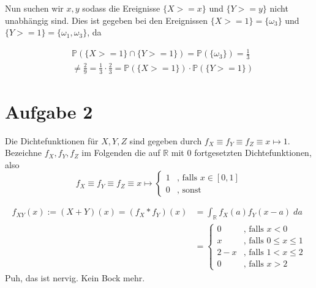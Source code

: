 \documentclass[11pt,a4paper,ngerman]{article}
\newcommand{\set}[1]{ \{ #1 \}}
\newcommand{\Prob}{\mathbb{P}}
\begin{document}
Nun suchen wir $x, y$ sodass die Ereignisse $\set{X >= x}$ und $\set{Y >= y}$ nicht unabhängig sind.
Dies ist gegeben bei den Ereignissen $\set{X >=1}  = \set{\omega_3}$ und $\set{Y >=1} = \set{\omega_1, \omega_3}$, da

\begin{equation}\begin{split}
 &\Prob(\set{X >=1} \cap \set{Y>=1})=  \Prob(\set{\omega_3}) =  \frac{1}{3} \\
&\neq \frac{2}{9}= \frac{1}{3} \cdot \frac{2}{3} = \Prob(\set{X>=1}) \cdot \Prob(\set{Y>=1})
\end{split}\end{equation}

\section*{Aufgabe 2}
Die Dichtefunktionen für $X, Y, Z$ sind gegeben durch $f_X \equiv f_Y \equiv f_Z \equiv x \mapsto 1$.
Bezeichne $f_X, f_Y, f_Z$ im Folgenden die auf $\mathbb{R}$ mit 0 fortgesetzten Dichtefunktionen, also
\begin{equation}
f_X \equiv f_Y \equiv f_Z \equiv x \mapsto \begin{cases}
								1 & \text{, falls $x \in [0,1]$} \\
								0 & \text{, sonst}
							\end{cases}
\end{equation}

\begin{equation}\begin{split}
f_{XY}(x) := (X+Y)(x) = (f_X * f_Y)(x) &= \int_\mathbb{R} f_X(a) f_Y(x-a) \;da \\
&= \begin{cases}
		0 & \text{, falls $x < 0$} \\
		x & \text{, falls $0 \leq x \leq 1$} \\
		2-x  & \text{, falls $1 < x \leq 2$} \\
		0 & \text{, falls $x > 2$}
     \end{cases}
\end{split}\end{equation}
Puh, das ist nervig. Kein Bock mehr.

\label{LastPage}
\end{document}
